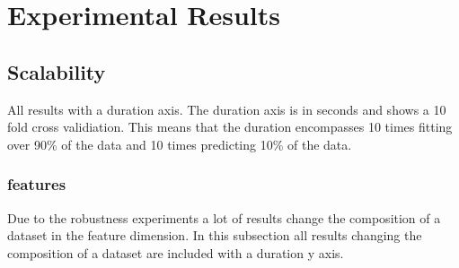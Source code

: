 \documentclass[a4paper,10pt]{article}
\begin{document}
\section{Experimental Results} \label{Chapter4}


\subsection{Scalability}
All results with a duration axis. The duration axis is in seconds and shows a 10 fold cross validiation. This means that the duration encompasses 10 times fitting over 90\% of the data and 10 times predicting 10\% of the data.

\subsubsection{features}
Due to the robustness experiments a lot of results change the composition of a dataset in the feature dimension. In this subsection all results changing the composition of a dataset are included with a duration y axis. 
\end{document}
